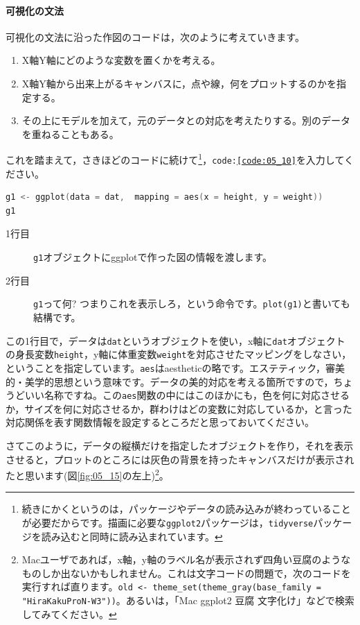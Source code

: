 \documentclass{ltjsbook}
\begin{document}
\paragraph{可視化の文法}
可視化の文法に沿った作図のコードは，次のように考えていきます。
\begin{enumerate}
	\item X軸Y軸にどのような変数を置くかを考える。
	\item X軸Y軸から出来上がるキャンバスに，点や線，何をプロットするのかを指定する。
	\item その上にモデルを加えて，元のデータとの対応を考えたりする。別のデータを重ねることもある。
\end{enumerate}
これを踏まえて，さきほどのコードに続けて\footnote{続きにかくというのは，パッケージやデータの読み込みが終わっていることが必要だからです。描画に必要な\texttt{ggplot2}パッケージは，\texttt{tidyverse}パッケージを読み込むと同時に読み込まれています。}，\texttt{code:\ref{code:05_10}}を入力してください。

\begin{lstlisting}[language=c++,label={code:05_10},caption={まずはキャンバスを設定する}]
g1 <- ggplot(data = dat,  mapping = aes(x = height, y = weight))
g1
\end{lstlisting}

\begin{description}
	\item[1行目] \texttt{g1}オブジェクトにggplotで作った図の情報を渡します。
	\item[2行目] \texttt{g1}って何? つまりこれを表示しろ，という命令です。\texttt{plot(g1)}と書いても結構です。
\end{description}
この1行目で，データは\texttt{dat}というオブジェクトを使い，x軸に\texttt{dat}オブジェクトの身長変数\verb|height|，y軸に体重変数\verb|weight|を対応させたマッピングをしなさい，ということを指定しています。\texttt{aes}はaestheticの略です。エステティック，審美的・美学的思想という意味です。データの美的対応を考える箇所ですので，ちょうどいい名称ですね。この\texttt{aes}関数の中にはこのほかにも，色を何に対応させるか，サイズを何に対応させるか，群わけはどの変数に対応しているか，と言った対応関係を表す関数情報を設定するところだと思っておいてください。

さてこのように，データの縦横だけを指定したオブジェクトを作り，それを表示させると，プロットのところには灰色の背景を持ったキャンバスだけが表示されたと思います(図\ref{fig:05_15}の左上)\footnote{Macユーザであれば，x軸，y軸のラベル名が表示されず四角い豆腐のようなものしか出ないかもしれません。これは文字コードの問題で，次のコードを実行すれば直ります。\verb|old <- theme_set(theme_gray(base_family = "HiraKakuProN-W3"))|。あるいは，「Mac ggplot2 豆腐 文字化け」などで検索してみてください。}。
\end{document}
